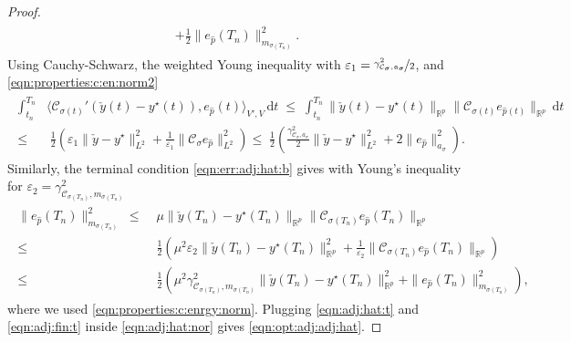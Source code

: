 \documentclass[reqno]{amsart}
\newcommand{\R}{\mathbb R}
\newcommand{\adState}{p}
\newcommand{\outVar}{y}
\newcommand{\outVarDim}{p}
\newcommand{\dt}{\,\mathrm{d}t}
\newcommand{\cOper}{\calC}
\newcommand{\optOutVar}{\outVar^\star}
\newcommand{\switch}{\sigma}
\newcommand{\intermediateAdStateA}{{\hat \adState}}
\newcommand{\intermediateOutVar}{\check{\outVar}}
\newcommand{\calC}{\mathcal{C}}
\begin{document}
\begin{proof}
\begin{align}
\begin{aligned}
        + \tfrac{1}{2} \|e_{\intermediateAdStateA}(T_n)\|_{m_{\switch(T_n)}}^2.
  \end{aligned}
	\end{align}
Using Cauchy-Schwarz, the weighted Young inequality with $\varepsilon_1=\nicefrac{\gamma^2_{\cOper_{\switch},\mathfrak{a}_{\switch}}}{2}$, and \eqref{eqn:properties:c:en:norm2}
%
 \begin{align}\label{eqn:adj:hat:t}
    \begin{aligned}
		\int_{t_n}^{T_n}& \langle \cOper_{\switch(t)}'(\intermediateOutVar(t) - \optOutVar(t)), e_{\intermediateAdStateA}(t)\rangle_{V',V} \dt\;\le\;\int_{t_n}^{T_n}\|\intermediateOutVar(t) - \optOutVar(t)\|_{\R^{\outVarDim}}\|\cOper_{\switch(t)} e_{\intermediateAdStateA(t)}\|_{\R^{\outVarDim}}\dt\\
  \le&\;\tfrac{1}{2}\left(\varepsilon_1\|\intermediateOutVar - \optOutVar\|^2_{L^2}+\frac{1}{\varepsilon_1}\|\cOper_{\switch}e_{\intermediateAdStateA}\|^2_{L^2}\right)
  \leq \;\tfrac{1}{2}\left(\tfrac{\gamma^2_{\cOper_{\switch},{a}_{\switch}}}{2}\|\intermediateOutVar - \optOutVar\|^2_{L^2}+2\|e_{\intermediateAdStateA}\|^2_{a_{\switch}}\right).
  \end{aligned}
	\end{align}
 Similarly, the terminal condition \eqref{eqn:err:adj:hat:b} gives with Young's inequality for $\varepsilon_2=\gamma^2_{\cOper_{\sigma(T_n)},m_{\switch(T_n)}}$
    \begin{align}\label{eqn:adj:fin:t}
      \begin{aligned}
        \|e_{\intermediateAdStateA}(T_n)\|^2_{m_{\switch(T_n)}} \;\leq&\;  \mu \| \intermediateOutVar(T_n) - \optOutVar(T_n)\|_{\R^{\outVarDim}}\|\cOper_{\switch(T_n)}e_{\intermediateAdStateA}(T_n)\|_{\R^{\outVarDim}}\\
        \leq&\;\tfrac{1}{2}\left(\mu^2 \varepsilon_2\| \intermediateOutVar(T_n) - \optOutVar(T_n)\|^2_{\R^{\outVarDim}}+\frac{1}{\varepsilon_2}\|\cOper_{\switch(T_n)}e_{\intermediateAdStateA}(T_n)\|_{\R^{\outVarDim}}\right)\\
        \leq&\;\tfrac{1}{2}\left( \mu^2\gamma^2_{\cOper_{\sigma(T_n)},m_{\switch(T_n)}}\| \intermediateOutVar(T_n) - \optOutVar(T_n)\|^2_{\R^{\outVarDim}}+\|e_{\intermediateAdStateA}(T_n)\|^2_{m_{\switch(T_n)}}\right),
     \end{aligned}
    \end{align}
    where we used \eqref{eqn:properties:c:enrgy:norm}. Plugging \eqref{eqn:adj:hat:t} and \eqref{eqn:adj:fin:t} inside \eqref{eqn:adj:hat:nor} gives \eqref{eqn:opt:adj:adj:hat}.
\end{proof}
\end{document}
